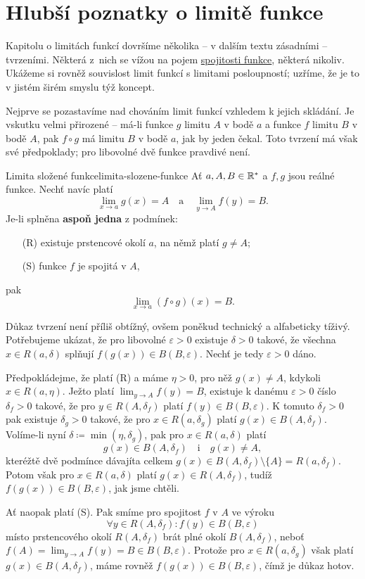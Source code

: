 \section{Hlubší poznatky o limitě funkce}
\label{sec:hlubsi-poznatky-o-limite-funkce}

Kapitolu o limitách funkcí dovršíme několika -- v dalším textu zásadními --
tvrzeními. Některá z~nich se vížou na pojem
\hyperref[def:spojita-funkce]{spojitosti funkce}, některá nikoliv. Ukážeme si
rovněž souvislost limit funkcí s limitami posloupností; uzříme, že je to v
jistém širém smyslu týž koncept.

Nejprve se pozastavíme nad chováním limit funkcí vzhledem k jejich skládání. Je
vskutku velmi přirozené -- má-li funkce $g$ limitu $A$ v bodě $a$ a funkce $f$
limitu $B$ v bodě $A$, pak $f \circ g$ má limitu $B$ v bodě $a$, jak by jeden
čekal. Toto tvrzení má však své předpoklady; pro libovolné dvě funkce pravdivé
není.

\begin{theorem}{Limita složené funkce}{limita-slozene-funkce}
 Ať $a,A,B \in \mathbb{R}^{*}$ a $f,g$ jsou reálné funkce. Nechť navíc platí
 \[
  \lim_{x \to a} g(x) = A \quad \text{a} \quad \lim_{y \to A} f(y) = B.
 \]
 Je-li splněna \textbf{aspoň jedna} z podmínek:
 \begin{itemize}
  \item [(R)] existuje prstencové okolí $a$, na němž platí $g \neq A$;
  \item [(S)] funkce $f$ je spojitá v $A$,
 \end{itemize}
 pak
 \[
  \lim_{x \to a} (f \circ g)(x) = B.
 \]
\end{theorem}
\begin{thmproof}
 Důkaz tvrzení není příliš obtížný, ovšem poněkud technický a alfabeticky
 tíživý. Potřebujeme ukázat, že pro libovolné $\varepsilon>0$ existuje
 $\delta>0$ takové, že všechna $x \in R(a,\delta)$ splňují $f(g(x)) \in
 B(B,\varepsilon)$. Nechť je tedy $\varepsilon>0$ dáno.

 Předpokládejme, že platí (R) a máme $\eta>0$, pro něž $g(x) \neq A$, kdykoli $x
 \in R(a,\eta)$. Ježto platí $\lim_{y \to A} f(y) = B$, existuje k danému
 $\varepsilon>0$ číslo $\delta_f>0$ takové, že pro $y \in R(A,\delta_f)$ platí
 $f(y) \in B(B,\varepsilon)$. K tomuto $\delta_f>0$ pak existuje $\delta_g>0$
 takové, že pro $x \in R(a,\delta_g)$ platí $g(x) \in B(A,\delta_f)$. Volíme-li
 nyní $\delta \coloneqq \min(\eta,\delta_g)$, pak pro $x \in R(a,\delta)$ platí
 \[
  g(x) \in B(A,\delta_f) \quad \text{i} \quad g(x) \neq A,
 \]
 kteréžtě dvě podmínce dávajíta celkem $g(x) \in B(A,\delta_f) \setminus \{A\} =
 R(a,\delta_f)$. Potom však pro $x \in R(a,\delta)$ platí $g(x) \in
 R(A,\delta_f)$, tudíž $f(g(x)) \in B(B,\varepsilon)$, jak jsme chtěli.
  
 Ať naopak platí (S). Pak smíme pro spojitost $f$ v $A$ ve výroku
 \[
 \forall y \in R(A,\delta_f): f(y) \in B(B,\varepsilon)
 \]
 místo prstencového okolí $R(A,\delta_f)$ brát plné okolí $B(A,\delta_f)$, neboť
 $f(A) = \lim_{y \to A} f(y) = B \in B(B,\varepsilon)$. Protože pro $x \in
 R(a,\delta_g)$ však platí $g(x) \in B(A,\delta_f)$, máme rovněž $f(g(x)) \in
 B(B,\varepsilon)$, čímž je důkaz hotov.  
\end{thmproof}

